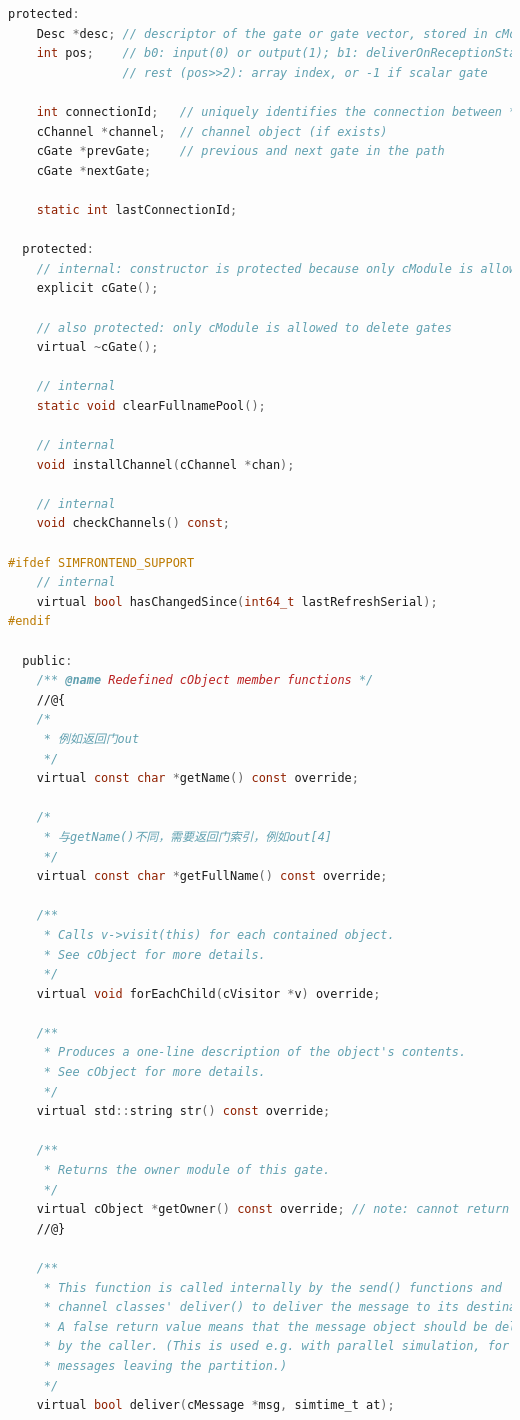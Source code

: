 \begin{lstlisting}[language=c]
  protected:
    Desc *desc; // descriptor of the gate or gate vector, stored in cModule
    int pos;    // b0: input(0) or output(1); b1: deliverOnReceptionStart bit;
                // rest (pos>>2): array index, or -1 if scalar gate

    int connectionId;   // uniquely identifies the connection between *this and *nextgatep; -1 if unconnected
    cChannel *channel;  // channel object (if exists)
    cGate *prevGate;    // previous and next gate in the path
    cGate *nextGate;

    static int lastConnectionId;

  protected:
    // internal: constructor is protected because only cModule is allowed to create instances
    explicit cGate();

    // also protected: only cModule is allowed to delete gates
    virtual ~cGate();

    // internal
    static void clearFullnamePool();

    // internal
    void installChannel(cChannel *chan);

    // internal
    void checkChannels() const;

#ifdef SIMFRONTEND_SUPPORT
    // internal
    virtual bool hasChangedSince(int64_t lastRefreshSerial);
#endif

  public:
    /** @name Redefined cObject member functions */
    //@{
    /*
     * 例如返回门out
     */
    virtual const char *getName() const override;

    /*
     * 与getName()不同，需要返回门索引，例如out[4]
     */
    virtual const char *getFullName() const override;

    /**
     * Calls v->visit(this) for each contained object.
     * See cObject for more details.
     */
    virtual void forEachChild(cVisitor *v) override;

    /**
     * Produces a one-line description of the object's contents.
     * See cObject for more details.
     */
    virtual std::string str() const override;

    /**
     * Returns the owner module of this gate.
     */
    virtual cObject *getOwner() const override; // note: cannot return cModule* (covariant return type) due to declaration order
    //@}

    /**
     * This function is called internally by the send() functions and
     * channel classes' deliver() to deliver the message to its destination.
     * A false return value means that the message object should be deleted
     * by the caller. (This is used e.g. with parallel simulation, for
     * messages leaving the partition.)
     */
    virtual bool deliver(cMessage *msg, simtime_t at);


\end{lstlisting}
